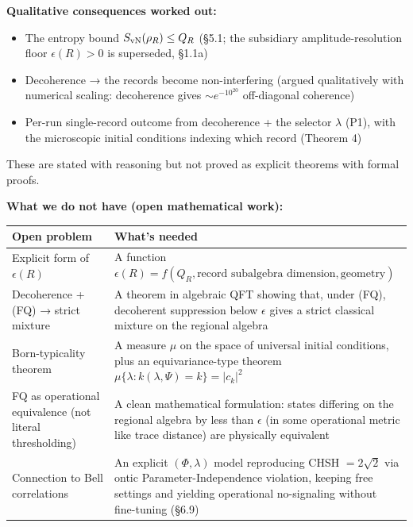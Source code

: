 \documentclass[11pt,a4paper]{article}
\begin{document}
\textbf{Qualitative consequences worked out:}

\begin{itemize}
  \item The entropy bound $S_{\rm vN}(\rho_R) \le Q_R$ (§5.1; the subsidiary amplitude-resolution floor $\epsilon(R) > 0$ is superseded, §1.1a)
  \item Decoherence → the records become non-interfering (argued qualitatively with numerical scaling: decoherence gives $\sim e^{-10^{20}}$ off-diagonal coherence)
  \item Per-run single-record outcome from decoherence + the selector $\lambda$ (P1), with the microscopic initial conditions indexing which record (Theorem 4)
\end{itemize}

These are stated with reasoning but not proved as explicit theorems with formal proofs.

\textbf{What we do not have (open mathematical work):}

\begin{center}
\small
\begin{tabularx}{\linewidth}{|Y|Y|}
\hline
\textbf{Open problem} & \textbf{What's needed} \\
\hline
Explicit form of $\epsilon(R)$ & A function $\epsilon(R) = f(Q_R, \text{record subalgebra dimension}, \text{geometry})$ \\
\hline
Decoherence + (FQ) → strict mixture & A theorem in algebraic QFT showing that, under (FQ), decoherent suppression below $\epsilon$ gives a strict classical mixture on the regional algebra \\
\hline
Born-typicality theorem & A measure $\mu$ on the space of universal initial conditions, plus an equivariance-type theorem $\mu\{\lambda : k(\lambda, \Psi) = k\} = \vert c_k\vert ^2$ \\
\hline
FQ as operational equivalence (not literal thresholding) & A clean mathematical formulation: states differing on the regional algebra by less than $\epsilon$ (in some operational metric like trace distance) are physically equivalent \\
\hline
Connection to Bell correlations & An explicit $(\Phi,\lambda)$ model reproducing CHSH $=2\sqrt2$ via ontic Parameter-Independence violation, keeping free settings and yielding operational no-signaling without fine-tuning (§6.9) \\
\hline
\end{tabularx}
\end{center}
\end{document}
